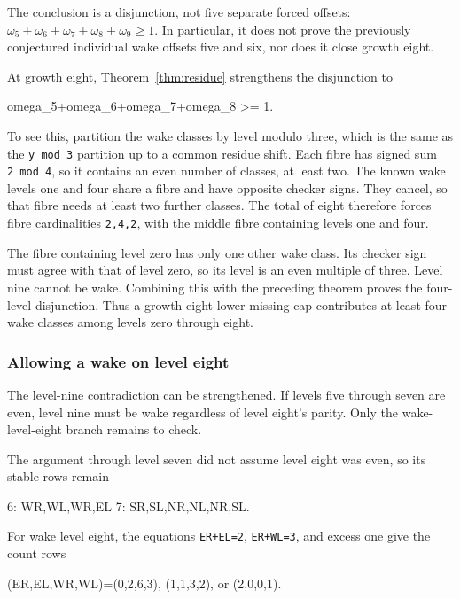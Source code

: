 \documentclass[11pt,letterpaper]{article}
\theoremstyle{plain}
\theoremstyle{definition}
\begin{document}
\begin{NoHyper}
The conclusion is a disjunction, not five separate forced offsets: $\omega_5+\omega_6+\omega_7+\omega_8+\omega_9\ge1$. In particular, it does not prove the previously conjectured individual wake offsets five and six, nor does it close growth eight.

At growth eight, Theorem~\ref{thm:residue} strengthens the disjunction to

\begin{codeblock}
omega_5+omega_6+omega_7+omega_8 >= 1.
\end{codeblock}

To see this, partition the wake classes by level modulo three, which is the same as the \texttt{y\ mod\ 3} partition up to a common residue shift. Each fibre has signed sum \texttt{2\ mod\ 4}, so it contains an even number of classes, at least two. The known wake levels one and four share a fibre and have opposite checker signs. They cancel, so that fibre needs at least two further classes. The total of eight therefore forces fibre cardinalities \texttt{2,4,2}, with the middle fibre containing levels one and four.

The fibre containing level zero has only one other wake class. Its checker sign must agree with that of level zero, so its level is an even multiple of three. Level nine cannot be wake. Combining this with the preceding theorem proves the four-level disjunction. Thus a growth-eight lower missing cap contributes at least four wake classes among levels zero through eight.

\subsubsection{Allowing a wake on level eight}

The level-nine contradiction can be strengthened. If levels five through seven are even, level nine must be wake regardless of level eight's parity. Only the wake-level-eight branch remains to check.

The argument through level seven did not assume level eight was even, so its stable rows remain

\begin{codeblock}
6: WR,WL,WR,EL
7: SR,SL,NR,NL,NR,SL.
\end{codeblock}

For wake level eight, the equations \texttt{ER+EL=2}, \texttt{ER+WL=3}, and excess one give the count rows

\begin{codeblock}
(ER,EL,WR,WL)=(0,2,6,3), (1,1,3,2), or (2,0,0,1).
\end{codeblock}


\end{NoHyper}
\end{document}
